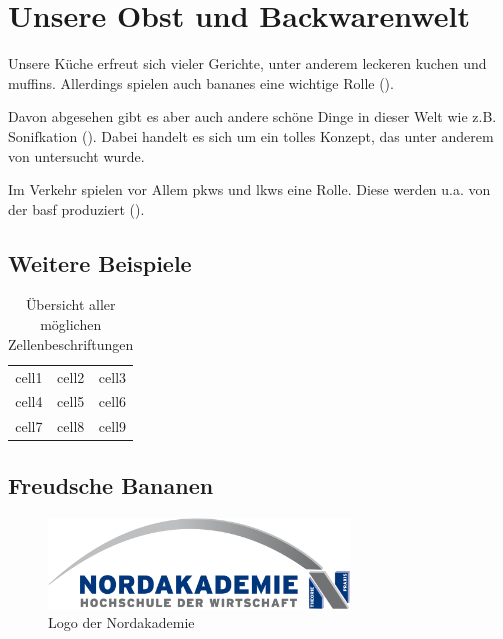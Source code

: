 \section{Unsere Obst und Backwarenwelt}
\label{sec:ObstUndBackwaren}

Unsere Küche erfreut sich vieler Gerichte, unter anderem leckeren \Gls{kuchen} und \Glspl{muffin}. Allerdings spielen auch \Glspl{banane} eine wichtige Rolle (\cite{halimSonificationNovelApproach2006}).

Davon abgesehen gibt es aber auch andere schöne Dinge in dieser Welt wie z.B. Sonifkation (\cite{hermannListenYourData1999}). Dabei handelt es sich um ein tolles Konzept, das unter anderem von \citeauthor{hermannSonificationHandbook2011a} untersucht wurde.

Im Verkehr spielen vor Allem \Glspl{pkw} und \Glspl{lkw} eine Rolle. Diese werden u.a. von der \Gls{basf} produziert (\cite{erdmannSonifikationBildern}).

\subsection{Weitere Beispiele}
\blindtext

\begin{table}[ht]
    \begin{tabular}{ c c c }
        cell1 & cell2 & cell3 \\ 
        cell4 & cell5 & cell6 \\  
        cell7 & cell8 & cell9 \\
    \end{tabular}
    \caption{Übersicht aller möglichen Zellenbeschriftungen}
\end{table}

\subsection{Freudsche Bananen}
\blindtext

\begin{figure}[ht]
    \includegraphics[width=8cm]{dokumente/bilder/Nordakademie_Logo_gross.jpg}
    \centering
    \caption{Logo der Nordakademie}
\end{figure}

